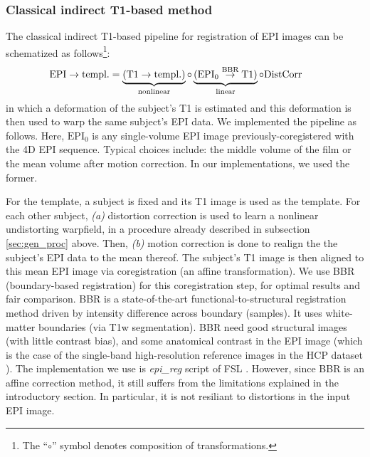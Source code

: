 \subsubsection{Classical indirect T1-based method}
\label{sec:classical}
The classical indirect T1-based pipeline for registration of EPI images can be schematized as
follows\footnote{The ``$\circ$'' symbol denotes composition of transformations.}:
\begin{eqnarray}
  \begin{split}
    \hspace{-1.8em}\text{EPI} \rightarrow \text{templ.} =
    \underbrace{(\text{T1} \rightarrow \text{templ.})}_{\text{nonlinear}} \circ \underbrace{(\text{EPI}_0
      \overset{\text{BBR}}{\rightarrow} \text{T1})}_{\text{linear}} \circ \text{DistCorr}
    \end{split}
  \label{eq:dct1_pl}
\end{eqnarray}
in which a deformation of the subject's T1 is
estimated and this deformation is then used to warp the same subject's
EPI data. We implemented the pipeline as follows. Here, $\text{EPI}_0$ is any single-volume EPI
image previously-coregistered with the 4D EPI sequence. Typical choices include: the middle
volume of the film or the mean volume after motion correction. In our implementations, we used the
former.

 For the template, a subject is fixed
and its T1 image is used as the template. For each other subject,
\textit{(a)} distortion correction is used to learn a nonlinear
    undistorting warpfield, in a procedure already described in
    subsection \ref{sec:gen_proc} above. Then,
\textit{(b)} motion correction is done to realign the the
subject's EPI data to the mean thereof.
    The subject's T1 image is then aligned to this
    mean EPI image via coregistration (an affine transformation).
We use BBR (boundary-based registration)
    \citep{greve2009accurate} for this coregistration step,
    for optimal results and fair comparison.
    BBR is a state-of-the-art functional-to-structural registration method driven by intensity
    difference across boundary (samples). It uses white-matter boundaries (via T1w segmentation).
    BBR need good structural images
    (with little contrast bias), and some anatomical contrast in the EPI image (which
    is the case of the single-band high-resolution reference images in the HCP dataset
    \citep{VanEssen20122222}). The implementation we use is \textit{epi\_reg} script of FSL
    \citep{smith2004}.
    However, since BBR is an affine correction method, it still suffers from the limitations explained in
    the introductory section. In particular, it is not resiliant to distortions in the input EPI
    image.
    
